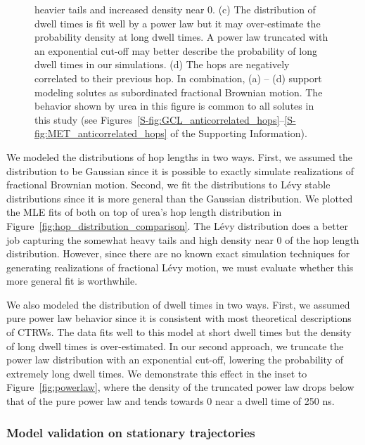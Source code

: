 \documentclass{article}
\begin{document}
\begin{figure}
{  heavier tails and increased density near 0. (c) The distribution of dwell times is fit
  well by a power law but it may over-estimate the probability density at long dwell times.
  A power law truncated with an exponential cut-off may better describe the probability of
  long dwell times in our simulations. (d) The hops are negatively correlated to their previous
  hop. In combination, (a) -- (d) support modeling solutes as subordinated fractional Brownian
  motion. The behavior shown by urea in this figure is common to all solutes in this study (see
  Figures~\ref{S-fig:GCL_anticorrelated_hops}--\ref{S-fig:MET_anticorrelated_hops} of the
  Supporting Information).}\label{fig:anticorrelated_hops}
  \end{figure}
  
  We modeled the distributions of hop lengths in two ways. First, we assumed the 
  distribution to be Gaussian since it is possible to exactly simulate realizations of
  fractional Brownian motion. Second, we fit the distributions to L\'evy stable 
  distributions since it is more general than the Gaussian distribution. We plotted
  the MLE fits of both on top of urea's hop length distribution in 
  Figure~\ref{fig:hop_distribution_comparison}. The L\'evy distribution does a better
  job capturing the somewhat heavy tails and high density near 0 of the hop length distribution.
  However, since there are no known exact simulation techniques for generating 
  realizations of fractional L\'evy motion, we must evaluate whether this more general
  fit is worthwhile. 
  
  We also modeled the distribution of dwell times in two ways. First, we assumed pure
  power law behavior since it is consistent with most theoretical descriptions of CTRWs.
  The data fits well to this model at short dwell times but the density of long dwell
  times is over-estimated. In our second approach, we truncate the power law distribution
  with an exponential cut-off, lowering the probability of extremely long dwell times. 
  We demonstrate this effect in the inset to Figure~\ref{fig:powerlaw}, where the
  density of the truncated power law drops below that of the pure power law and tends towards
  0 near a dwell time of 250 ns.
  
  \subsubsection{Model validation on stationary trajectories}\label{section:sfbm_validation}
\end{document}
